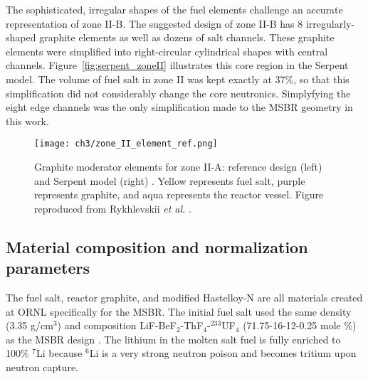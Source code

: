 The sophisticated, irregular shapes of the fuel elements challenge an accurate 
representation of zone II-B. The suggested design 
\cite{robertson_conceptual_1971} of zone II-B has 8 irregularly-shaped 
graphite elements as well as dozens of salt channels. These graphite elements 
were simplified into right-circular cylindrical shapes with central channels. 
Figure~\ref{fig:serpent_zoneII} illustrates this core region in the Serpent 
model. The volume of fuel salt in zone II was kept exactly at 37\%, so that 
this simplification did not considerably change the core neutronics. 
Simplyfying the eight edge channels was the only simplification made to the 
\gls{MSBR} geometry in this work. 
\begin{figure}[ht!] %
	\texttt{[image: ch3/zone\_II\_element\_ref.png]}
	\caption{Graphite moderator elements for zone II-A: reference design (left)
		\cite{robertson_conceptual_1971} and Serpent model (right) 
		\cite{rykhlevskii_full-core_2017}.  Yellow 
		represents fuel salt, purple represents graphite, and aqua represents 
		the reactor vessel. Figure reproduced from Rykhlevskii \emph{et al.} 
		\cite{rykhlevskii_modeling_2019}.}
	\label{fig:II_element_ref}
\end{figure}

\subsection{Material composition and normalization parameters}
The fuel salt, reactor graphite, and modified Hastelloy-N
are all materials created at \gls{ORNL} specifically for the \gls{MSBR}.
The initial fuel salt used the same density (3.35 g/cm$^3$) and composition 
LiF-BeF$_2$-ThF$_4$-$^{233}$UF$_4$ (71.75-16-12-0.25 mole \%) as the 
\gls{MSBR} design \cite{robertson_conceptual_1971}. The lithium in the molten 
salt fuel is fully enriched to 100\% $^{7}$Li because $^{6}$Li is a very 
strong neutron poison and becomes tritium upon neutron capture. 


